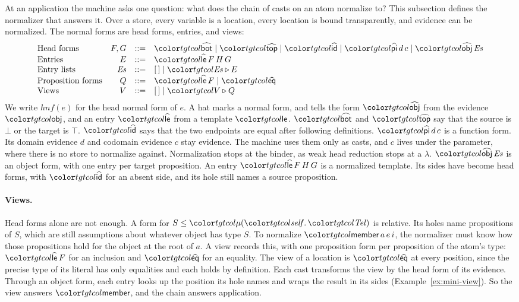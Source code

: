 At an application the machine asks one question: what does the chain of casts on an atom normalize to? This subsection defines the normalizer that answers it. Over a store, every variable is a location, every location is bound transparently, and evidence can be normalized. The normal forms are head forms, entries, and views:
\[
\begin{array}{@{}lrcl@{}}
\text{Head forms} & F, G & ::= & \form{bot} \mid \form{top} \mid \form{id} \mid \form{pi}\,d\,c \mid \form{obj}\,\mathit{Es} \\
\text{Entries} & E & ::= & \form{le}\,F\,H\,G \\
\text{Entry lists} & \mathit{Es} & ::= & \tnil \mid \tcons{\mathit{Es}}{E} \\
\text{Proposition forms} & Q & ::= & \form{le}\,F \mid \form{eq} \\
\text{Views} & V & ::= & \tnil \mid \tcons{V}{Q}
\end{array}
\]
We write $\mathit{hnf}(e)$ for the head normal form of $e$. A hat marks a normal form, and tells the form $\form{obj}$ from the evidence $\ev{obj}$, and an entry $\form{le}$ from a template $\ev{le}$. $\form{bot}$ and $\form{top}$ say that the source is $\bot$ or the target is $\top$. $\form{id}$ says that the two endpoints are equal after following definitions. $\form{pi}\,d\,c$ is a function form. Its domain evidence $d$ and codomain evidence $c$ stay evidence. The machine uses them only as casts, and $c$ lives under the parameter, where there is no store to normalize against. Normalization stops at the binder, as weak head reduction stops at a $\lambda$. $\form{obj}\,\mathit{Es}$ is an object form, with one entry per target proposition. An entry $\form{le}\,F\,H\,G$ is a normalized template. Its sides have become head forms, with $\form{id}$ for an absent side, and its hole still names a source proposition.

\paragraph{Views.}
Head forms alone are not enough. A form for $S \le \obj{\tel}$ is relative. Its holes name propositions of $S$, which are still assumptions about whatever object has type $S$. To normalize $\ev{member}\,a\,e\,i$, the normalizer must know how those propositions hold for the object at the root of $a$. A view records this, with one proposition form per proposition of the atom's type: $\form{le}\,F$ for an inclusion and $\form{eq}$ for an equality. The view of a location is $\form{eq}$ at every position, since the precise type of its literal has only equalities and each holds by definition. Each cast transforms the view by the head form of its evidence. Through an object form, each entry looks up the position its hole names and wraps the result in its sides (Example~\ref{ex:mini-view}). So the view answers $\ev{member}$, and the chain answers application.

